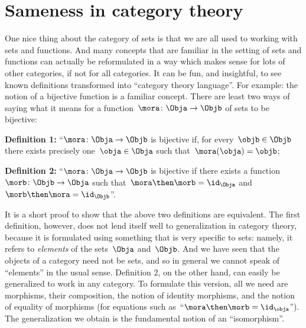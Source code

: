 \label{sec:attributes_sameness}


\section{Sameness in category theory}

One nice thing about the category of sets is that we are all used to working with sets and functions. And many concepts that are familiar in the setting of sets and functions can actually be reformulated in a way which makes sense for lots of other categories, if not for all categories. It can be fun, and insightful, to see known definitions transformed into ``category theory language''. For example: the notion of a bijective function is a familiar concept. There are least two ways of saying what it means for a function~$\mora \colon \Obja \to \Objb$ of sets to be bijective:

\textbf{Definition 1:} ``$\mora \colon \Obja \to \Objb$ is bijective if, for every~$\objb \in \Objb$ there exists precisely one~$\obja \in \Obja$ such that~$\mora(\obja) = \objb$;


\textbf{Definition 2:} ``$\mora\colon \Obja \to \Objb$ is bijective if there exists a function~$\morb\colon \Objb \to \Obja$ such that~$\mora \then \morb = \id_\Obja$ and~$\morb \then \mora = \id_\Objb$''.


It is a short proof to show that the above two definitions are equivalent. The first definition, however, does not lend itself well to generalization in category theory, because it is formulated using something that is very specific to sets: namely, it refers to \emph{elements} of the sets~$\Obja$ and~$\Objb$. And we have seen that the objects of a category need not be sets, and so in general we cannot speak of ``elements'' in the usual sense. Definition 2, on the other hand, can easily be generalized to work in any category. To formulate this version, all we need are morphisms, their composition, the notion of identity morphisms, and the notion of equality of morphisms (for equations such as~``$\mora \then \morb = \id_\obja$''). The generalization we obtain is the fundamental notion of an ``isomorphism''.



